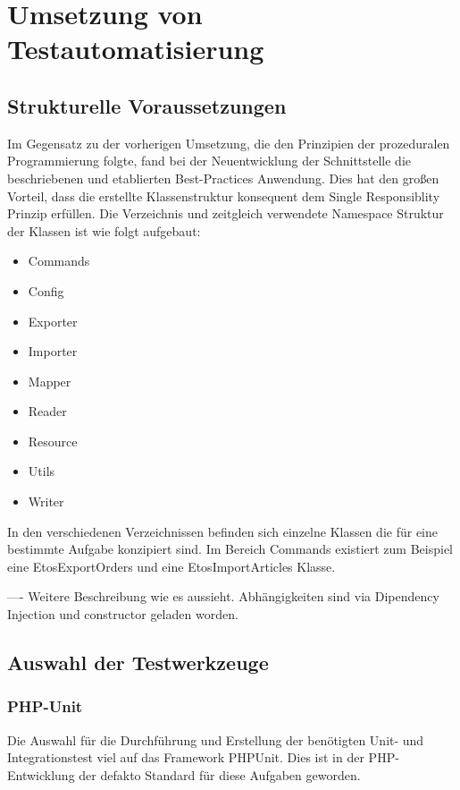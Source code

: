 \newpage
\section{Umsetzung von Testautomatisierung}

\subsection{Strukturelle Voraussetzungen}
Im Gegensatz zu der vorherigen Umsetzung, die den Prinzipien der prozeduralen Programmierung folgte, fand bei der Neuentwicklung der Schnittstelle die beschriebenen und etablierten Best-Practices Anwendung. Dies hat den großen Vorteil, dass die erstellte Klassenstruktur konsequent dem Single Responsiblity Prinzip erfüllen. Die Verzeichnis und zeitgleich verwendete Namespace Struktur der Klassen ist wie folgt aufgebaut:

\begin{itemize}
	\item Commands
	\item Config
	\item Exporter
	\item Importer
	\item Mapper
	\item Reader
	\item Resource
	\item Utils
	\item Writer
\end{itemize}

In den verschiedenen Verzeichnissen befinden sich einzelne Klassen die für eine bestimmte Aufgabe konzipiert sind. Im Bereich Commands existiert zum Beispiel eine EtosExportOrders und eine EtosImportArticles Klasse.

---- Weitere Beschreibung wie es aussieht. Abhängigkeiten sind via Dipendency Injection und constructor geladen worden.

\subsection{Auswahl der Testwerkzeuge}
\subsubsection{PHP-Unit}
Die Auswahl für die Durchführung und Erstellung der benötigten Unit- und Integrationstest viel auf das Framework PHPUnit. Dies ist in der PHP-Entwicklung der defakto Standard für diese Aufgaben geworden.

